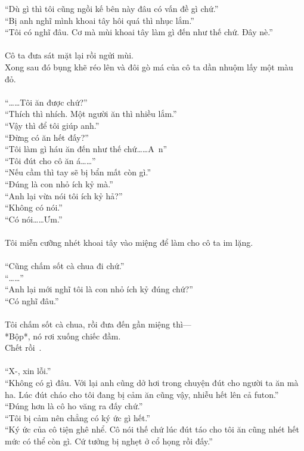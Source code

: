 \documentclass[12pt,a4paper, twosides]{book}
\begin{document}
“Dù gì thì tôi cũng ngồi kế bên này đâu có vấn đề gì chứ.”\\
“Bị anh nghĩ mình khoai tây hôi quá thì nhục lắm.”\\
“Tôi có nghĩ đâu. Cơ mà mùi khoai tây làm gì đến như thế chứ. Đây nè.”\\
\\
Cô ta đưa sát mặt lại rồi ngửi mùi.\\
Xong sau đó bụng khẽ réo lên và đôi gò má của cô ta dần nhuộm lấy một màu đỏ.\\
\\
“……Tôi ăn được chứ?”\\
“Thích thì nhích. Một người ăn thì nhiều lắm.”\\
“Vậy thì để tôi giúp anh.”\\
“Đừng có ăn hết đấy?”\\
“Tôi làm gì háu ăn đến như thế chứ……A~n”\\
“Tôi đút cho cô ăn á……”\\
“Nếu cầm thì tay sẽ bị bẩn mất còn gì.”\\
“Đúng là con nhỏ ích kỷ mà.”\\
“Anh lại vừa nói tôi ích kỷ hả?”\\
“Không có nói.”\\
“Có nói……Ưm.”\\
\\
Tôi miễn cưỡng nhét khoai tây vào miệng để làm cho cô ta im lặng.\\
\\
“Cũng chấm sốt cà chua đi chứ.”\\
“……”\\
“Anh lại mới nghĩ tôi là con nhỏ ích kỷ đúng chứ?”\\
“Có nghĩ đâu.”\\
\\
Tôi chấm sốt cà chua, rồi đưa đến gần miệng thì—\\
*Bộp*, nó rơi xuống chiếc đầm.\\
Chết rồi~.\\
\\
“X-, xin lỗi.”\\
“Không có gì đâu. Với lại anh cũng dở hơi trong chuyện đút cho người ta ăn mà ha. Lúc đút cháo cho tôi đang bị cảm ăn cũng vậy, nhiễu hết lên cả futon.”\\
“Đúng hơn là cô ho văng ra đấy chứ.”\\
“Tôi bị cảm nên chẳng có ký ức gì hết.”\\
“Ký ức của cô tiện ghê nhể. Cô nói thế chứ lúc đút táo cho tôi ăn cũng nhét hết mức có thể còn gì. Cứ tưởng bị nghẹt ở cổ họng rồi đấy.”\\
\end{document}

